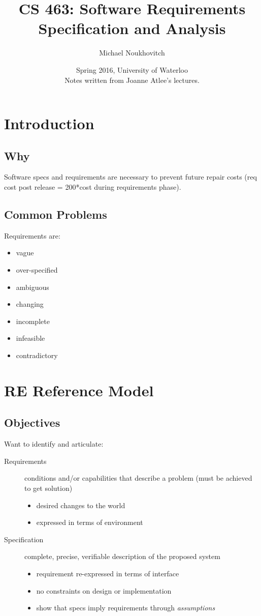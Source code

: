 \documentclass[]{article}
\theoremstyle{definition}
\begin{document}
	\let\ref\Cref

	\title{\bf{CS 463: Software Requirements Specification and Analysis}}
	\date{Spring 2016, University of Waterloo \\ \center Notes written from Joanne Atlee's lectures.}
	\author{Michael Noukhovitch}

	\maketitle
	\newpage
	\tableofcontents
	\newpage

	\section{Introduction}
	\subsection{Why}
	Software specs and requirements are necessary to prevent future repair costs (req cost post release = 200*cost during requirements phase).
	\subsection{Common Problems}
	Requirements are:
	\begin{itemize}
		\item vague 
		\item over-specified
		\item ambiguous
		\item changing
		\item incomplete
		\item infeasible
		\item contradictory
	\end{itemize}

	\section{RE Reference Model}
	\subsection{Objectives}
	Want to identify and articulate:
	\begin{description}
		\item[Requirements] conditions and/or capabilities that describe a problem (must be achieved to get solution)
			\begin{itemize}
				\item desired changes to the world
				\item expressed in terms of environment
			\end{itemize}
		\item[Specification] complete, precise, verifiable description of the proposed system
			\begin{itemize}
				\item requirement re-expressed in terms of interface
				\item no constraints on design or implementation
				\item show that specs imply requirements through \textit{assumptions}
			\end{itemize}
	\end{description}
\end{document}

